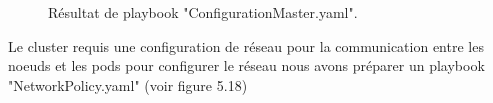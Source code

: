 {\begin{figure}[H]
\begin{center}
        \end{center}
        \caption{Résultat de playbook "ConfigurationMaster.yaml".}
       \end{figure} 
        Le cluster requis une configuration de réseau pour la communication entre les noeuds et les pods pour configurer le réseau nous avons préparer un playbook "NetworkPolicy.yaml" (voir figure 5.18)
       \begin{figure}[H]
        \begin{center}

\end{center}
\end{figure}}
